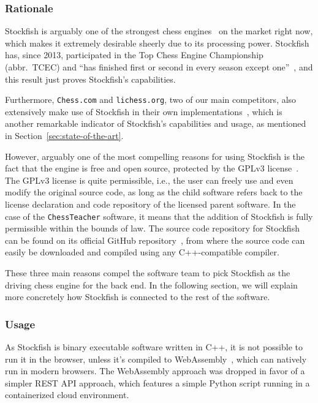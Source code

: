 \subsubsection{Rationale}

Stockfish is arguably one of the strongest chess engines~\cite{about-stockfish} on the market right now,
which makes it extremely desirable sheerly due to its processing power.
Stockfish has, since 2013, participated in the Top Chess Engine Championship (abbr.\ TCEC) and ``has finished first or
second in every season except one''~\cite{tcec-results,chess-com-stockfish},
and this result just proves Stockfish's capabilities.

Furthermore, \texttt{Chess.com} and \texttt{lichess.org}, two of our main competitors, also extensively make use of
Stockfish in their own implementations~\cite{chess-com-stockfish,about-lichess}, which is another remarkable indicator
of Stockfish's capabilities and usage, as mentioned in Section~\ref{sec:state-of-the-art}.

However, arguably one of the most compelling reasons for using Stockfish is the fact that the engine is free and open
source, protected by the GPLv3 license~\cite{gplv3}.
The GPLv3 license is quite permissible, i.e., the user can freely use and even modify the original source code, as long
as the child software refers back to the license declaration and code repository of the licensed parent software.
In the case of the \texttt{ChessTeacher} software, it means that the addition of Stockfish is fully permissible within
the bounds of law.
The source code repository for Stockfish can be found on its official GitHub repository~\cite{github-stockfish}, from
where the source code can easily be downloaded and compiled using any C++-compatible compiler.

These three main reasons compel the software team to pick Stockfish as the driving chess engine for the back end.
In the following section, we will explain more concretely how Stockfish is connected to the rest of the software.

\subsubsection{Usage}

As Stockfish is binary executable software written in C++, it is not possible to run it in the browser,
unless it's compiled to WebAssembly~\cite{web-assembly}, which can natively run in modern browsers.
The WebAssembly approach was dropped in favor of a simpler REST API approach,
which features a simple Python script running in a containerized cloud environment.

